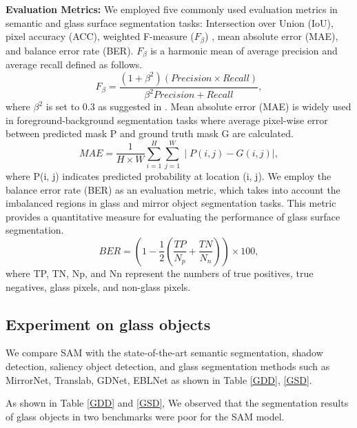 \documentclass{article}
\begin{document}
\textbf{Evaluation Metrics:}
We employed five commonly used evaluation metrics in semantic and glass surface segmentation tasks: Intersection over Union (IoU), pixel accuracy (ACC), weighted F-measure ($F_{\beta}$) \cite{margolin2014evaluate}, mean absolute error (MAE), and balance error rate (BER).
${F}_{\beta}$ is a harmonic mean of average precision and average recall defined as follows.
\begin{equation}
\label{eqn:03}
{\textit{F}_{\beta}}=\frac{(1+{\beta^{2}})(Precision\times{Recall})}{{\beta^{2}}Precision+Recall},
\end{equation}
where $\beta^{2}$ is set to 0.3 as suggested in \cite{achanta2009frequency}.
Mean absolute error (MAE) is widely used in foreground-background segmentation tasks where average pixel-wise error between predicted mask P and ground truth mask G are calculated.
\begin{equation}
\label{eqn:03}
{\textit{MAE}}=\frac{1}{H\times{W}}\sum_{i=1}^{H}\sum_{j=1}^{W}\mid P(i,j)-G(i,j)\mid,
\end{equation}
where P(i, j) indicates predicted probability at location (i, j).
We employ the balance error rate (BER) as an evaluation metric, which takes into account the imbalanced regions in glass and mirror object segmentation tasks. This metric provides a quantitative measure for evaluating the performance of glass surface segmentation.
\begin{equation}
\label{eqn:03}
{\textit{BER}}=(1-\frac{1}{2}(\frac{TP}{\textit{N}_{p}}+\frac{TN}{\textit{N}_{n}}))\times{100},
\end{equation}
where TP, TN, Np, and Nn represent the numbers of true positives, true negatives, glass pixels, and non-glass pixels.
\subsection{Experiment on glass objects}
We compare SAM with the state-of-the-art semantic segmentation, shadow detection, saliency object detection, and glass segmentation methods such as MirrorNet, Translab, GDNet, EBLNet as shown in Table \ref{GDD}, \ref{GSD}. 

As shown in Table \ref{GDD} and \ref{GSD}, We observed that the segmentation results of glass objects in two benchmarks were poor for the SAM model. 
\end{document}
